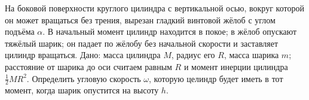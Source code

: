 На боковой поверхности круглого цилиндра с вертикальной осью,
вокруг которой он может вращаться без трения,
вырезан гладкий винтовой жёлоб с углом подъёма $\alpha$.
В начальный момент цилиндр находится в покое; в жёлоб опускают тяжёлый шарик;
он падает по жёлобу без начальной скорости и заставляет цилиндр вращаться.
Дано: масса цилиндра $M$, радиус его $R$, масса шарика $m$;
расстояние от шарика до оси считаем равным $R$ и момент инерции цилиндра
$\frac{1}{2}MR^2$.
Определить угловую скорость $\omega$, которую целиндр будет иметь в тот момент,
когда шарик опустится на высоту $h$.
